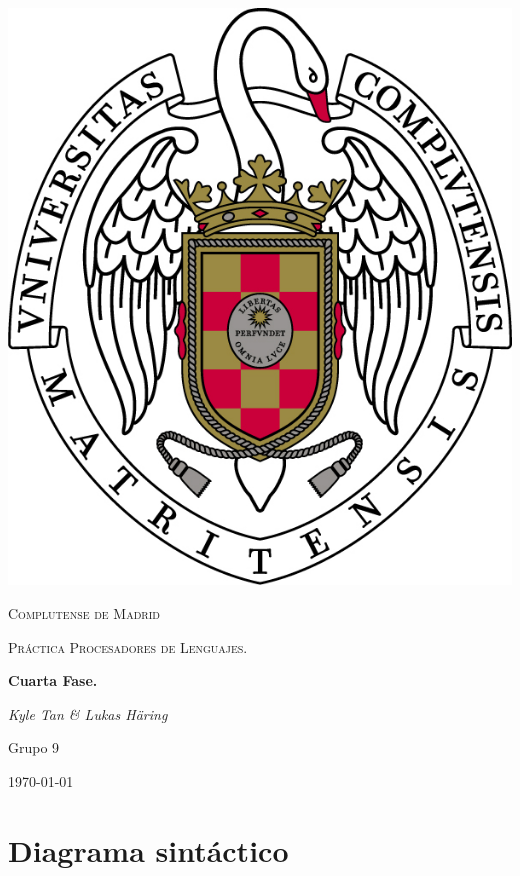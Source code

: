 \documentclass{article}
\begin{document}
\usetikzlibrary{automata,arrows, positioning}
\renewcommand{\contentsname}{Tabla de contenidos}

\begin{titlepage}
	\begin{center}
		\includegraphics{escudo.jpg}
	\end{center}
	\centering
	{\scshape\LARGE Complutense de Madrid \par}
	\vspace{1cm}
	{\scshape\Large Práctica Procesadores de Lenguajes.\par}
	\vspace{1.5cm}
	{\huge\bfseries Cuarta Fase. \par}
	\vspace{2cm}
	{\Large\itshape Kyle Tan \& Lukas Häring\par}
	{\large Grupo 9\par}
	\vfill
	\vfill

	{\large \today\par}
\end{titlepage}

\tableofcontents
\newpage
\section{Diagrama sintáctico}
\end{document}
